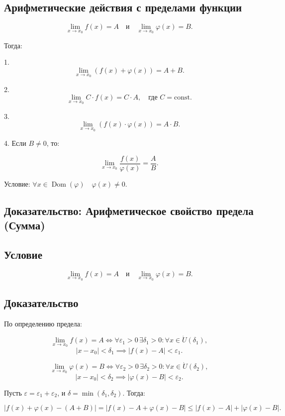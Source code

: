 \documentclass{article}
\begin{document}
\subsection{Арифметические действия с пределами функции} 

\[
\lim_{x \to x_0} f(x) = A \quad \text{и} \quad \lim_{x \to x_0} \varphi(x) = B.
\]

Тогда:

1. \[
\lim_{x \to x_0} (f(x) + \varphi(x)) = A + B.
\]

2. \[
\lim_{x \to x_0} C \cdot f(x) = C \cdot A, \quad \text{где } C = \text{const}.
\]

3. \[
\lim_{x \to x_0} (f(x) \cdot \varphi(x)) = A \cdot B.
\]

4. Если $B \neq 0$, то:

\[
\lim_{x \to x_0} \frac{f(x)}{\varphi(x)} = \frac{A}{B}.
\]

Условие: $\forall x \in \operatorname{Dom}(\varphi) \quad \varphi(x) \neq 0$.

\subsection*{Доказательство: Арифметическое свойство предела (Сумма)}

\subsection*{Условие}
\[
\lim_{x \to x_0} f(x) = A \quad \text{и} \quad \lim_{x \to x_0} \varphi(x) = B.
\]

\subsection*{Доказательство}
По определению предела:

\[
\lim_{x \to x_0} f(x) = A \iff \forall \varepsilon_1 > 0 \, \exists \delta_1 > 0 : \forall x \in \dot{U}(\delta_1),
\]
\[
|x - x_0| < \delta_1 \implies |f(x) - A| < \varepsilon_1.
\]

\[
\lim_{x \to x_0} \varphi(x) = B \iff \forall \varepsilon_2 > 0 \, \exists \delta_2 > 0 : \forall x \in \dot{U}(\delta_2),
\]
\[
|x - x_0| < \delta_2 \implies |\varphi(x) - B| < \varepsilon_2.
\]

Пусть $\varepsilon = \varepsilon_1 + \varepsilon_2$, и $\delta = \min(\delta_1, \delta_2)$. Тогда:

\[
|f(x) + \varphi(x) - (A + B)| = |f(x) - A + \varphi(x) - B| \leq |f(x) - A| + |\varphi(x) - B|.
\]
\end{document}

